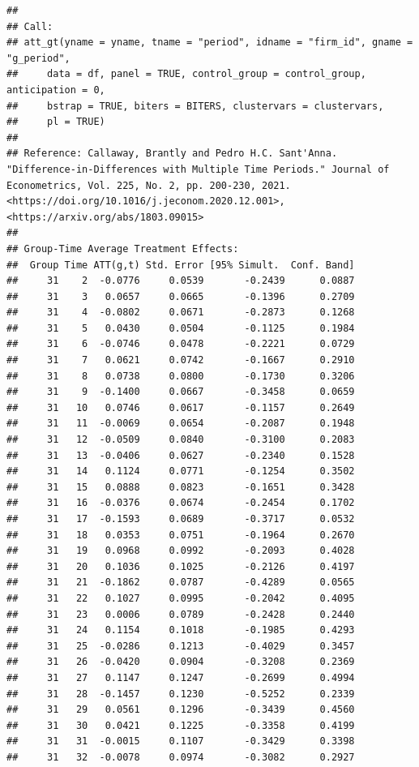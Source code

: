 \documentclass[
]{article}
\begin{document}
\begin{verbatim}
## 
## Call:
## att_gt(yname = yname, tname = "period", idname = "firm_id", gname = "g_period", 
##     data = df, panel = TRUE, control_group = control_group, anticipation = 0, 
##     bstrap = TRUE, biters = BITERS, clustervars = clustervars, 
##     pl = TRUE)
## 
## Reference: Callaway, Brantly and Pedro H.C. Sant'Anna.  "Difference-in-Differences with Multiple Time Periods." Journal of Econometrics, Vol. 225, No. 2, pp. 200-230, 2021. <https://doi.org/10.1016/j.jeconom.2020.12.001>, <https://arxiv.org/abs/1803.09015> 
## 
## Group-Time Average Treatment Effects:
##  Group Time ATT(g,t) Std. Error [95% Simult.  Conf. Band] 
##     31    2  -0.0776     0.0539       -0.2439      0.0887 
##     31    3   0.0657     0.0665       -0.1396      0.2709 
##     31    4  -0.0802     0.0671       -0.2873      0.1268 
##     31    5   0.0430     0.0504       -0.1125      0.1984 
##     31    6  -0.0746     0.0478       -0.2221      0.0729 
##     31    7   0.0621     0.0742       -0.1667      0.2910 
##     31    8   0.0738     0.0800       -0.1730      0.3206 
##     31    9  -0.1400     0.0667       -0.3458      0.0659 
##     31   10   0.0746     0.0617       -0.1157      0.2649 
##     31   11  -0.0069     0.0654       -0.2087      0.1948 
##     31   12  -0.0509     0.0840       -0.3100      0.2083 
##     31   13  -0.0406     0.0627       -0.2340      0.1528 
##     31   14   0.1124     0.0771       -0.1254      0.3502 
##     31   15   0.0888     0.0823       -0.1651      0.3428 
##     31   16  -0.0376     0.0674       -0.2454      0.1702 
##     31   17  -0.1593     0.0689       -0.3717      0.0532 
##     31   18   0.0353     0.0751       -0.1964      0.2670 
##     31   19   0.0968     0.0992       -0.2093      0.4028 
##     31   20   0.1036     0.1025       -0.2126      0.4197 
##     31   21  -0.1862     0.0787       -0.4289      0.0565 
##     31   22   0.1027     0.0995       -0.2042      0.4095 
##     31   23   0.0006     0.0789       -0.2428      0.2440 
##     31   24   0.1154     0.1018       -0.1985      0.4293 
##     31   25  -0.0286     0.1213       -0.4029      0.3457 
##     31   26  -0.0420     0.0904       -0.3208      0.2369 
##     31   27   0.1147     0.1247       -0.2699      0.4994 
##     31   28  -0.1457     0.1230       -0.5252      0.2339 
##     31   29   0.0561     0.1296       -0.3439      0.4560 
##     31   30   0.0421     0.1225       -0.3358      0.4199 
##     31   31  -0.0015     0.1107       -0.3429      0.3398 
##     31   32  -0.0078     0.0974       -0.3082      0.2927 

\end{verbatim}
\end{document}
